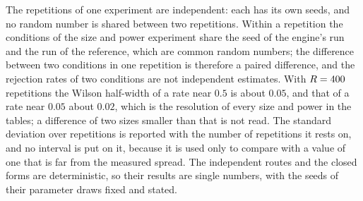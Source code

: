 The repetitions of one experiment are independent: each has its own seeds, and no random number is shared between two repetitions. Within a repetition the conditions of the size and power experiment share the seed of the engine's run and the run of the reference, which are common random numbers; the difference between two conditions in one repetition is therefore a paired difference, and the rejection rates of two conditions are not independent estimates. With $R=400$ repetitions the Wilson half-width of a rate near $0.5$ is about $0.05$, and that of a rate near $0.05$ about $0.02$, which is the resolution of every size and power in the tables; a difference of two sizes smaller than that is not read. The standard deviation over repetitions is reported with the number of repetitions it rests on, and no interval is put on it, because it is used only to compare with a value of one that is far from the measured spread. The independent routes and the closed forms are deterministic, so their results are single numbers, with the seeds of their parameter draws fixed and stated.
